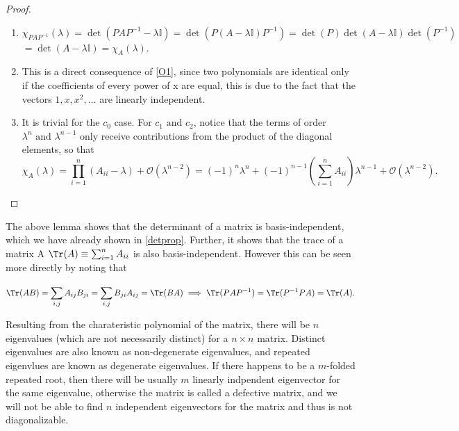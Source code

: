 \documentclass[a4paper,12pt]{report}
\begin{document}

\begin{proof}
\begin{enumerate}[label=(\(O\)\arabic*)] 
    \item \(\chi _{PAP^{-1} }(\lambda ) = \det (PAP^{-1} - \lambda \mathbb{I}) = \det (P(A-\lambda \mathbb{I})P^{-1} ) = \det (P)\det (A-\lambda \mathbb{I}) \det (P^{-1} )\) \(= \det (A - \lambda \mathbb{I}) = \chi _{A}(\lambda )  \).
    \item This is a direct consequence of \cref{O1}, since two polynomials are identical only if the coefficients of every power of x are equal, this is due to the fact that the vectors \(1, x, x^2, \ldots \) are linearly independent.
    \item It is trivial for the \(c_0 \) case. For \(c_1 \text { and } c_2 \), notice that the terms of order \(\lambda ^{n} \text { and } \lambda ^{n-1} \) only receive contributions from the product of the diagonal elements, so that
    \begin{equation}
        \chi _{A}(\lambda ) =   \prod_{i=1}^{n} (A_{ii} - \lambda  ) + \mathcal{O}(\lambda ^{n-2} ) = (-1)^{n} \lambda ^{n} + (-1)^{n-1} \left( \sum_{i=1}^{n} A_{ii}  \right) \lambda ^{n-1} + \mathcal{O}(\lambda ^{n-2} ).     
    \end{equation}
    
    
\end{enumerate}

\end{proof}

The above lemma shows that the determinant of a matrix is basis-independent, which we have already shown in \cref{detprop}. Further, it shows that the trace of a matrix A \(\Tr (A) \equiv \sum_{i=1}^{n} A_{ii}\) is also basis-independent. However this can be seen more directly by noting that 

\begin{equation}
    \Tr (AB) = \sum_{i,j}^{} A_{ij} B_{ji} = \sum_{i,j}^{} B_{ji} A_{ij} = \Tr (BA) \implies \Tr (PAP^{-1} ) = \Tr (P^{-1} PA) = \Tr (A).
\end{equation}

Resulting from the charateristic polynomial of the matrix, there will be \(n\) eigenvalues (which are not necessarily distinct) for a \(n \times n\) matrix. Distinct eigenvalues are also known as non-degenerate eigenvalues, and repeated eigenvlues are known as degenerate eigenvalues. If there happens to be a \(m\)-folded repeated root, then there will be usually \(m\) linearly indpendent eigenvector for the same eigenvalue, otherwise the matrix is called a defective matrix, and we will not be able to find \(n\) independent eigenvectors for the matrix and thus is not diagonalizable. 
\end{document}
